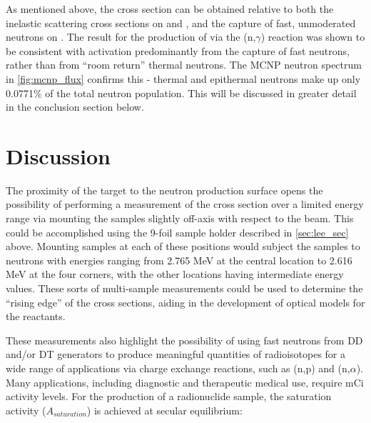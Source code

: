 As mentioned above, the cross section can be obtained relative to both the inelastic scattering cross sections on  and , and the capture of fast, unmoderated neutrons on .
The result for the production of  via the (n,$\gamma$) reaction was shown to be consistent with activation predominantly from the capture of fast neutrons, rather than from \enquote{room return} thermal neutrons.
The MCNP neutron spectrum in   \autoref{fig:mcnp_flux} confirms this - thermal and epithermal neutrons make up only 0.0771\% of the total neutron population.
 This will be discussed in greater detail in the conclusion section below.




 




          
\section{Discussion}




The proximity of the target to the neutron production surface opens the possibility of performing a measurement of the cross section over a limited energy range via mounting the samples slightly off-axis with respect to the beam.
 This could be accomplished using the 9-foil sample holder described in \autoref{sec:lee_sec} above.
 Mounting samples at each of these positions would subject the samples to neutrons with energies ranging from 2.765 MeV at the central location to 2.616 MeV at the four corners, with the other locations having intermediate energy values.
 These sorts of multi-sample measurements could be used to determine the \enquote{rising edge} of the cross sections, aiding in the development of optical models for the reactants.



These measurements also highlight the possibility of using fast neutrons from DD and/or DT generators to produce meaningful quantities of radioisotopes for a wide range of applications via charge exchange reactions, such as (n,p) and (n,$\alpha$).
 Many applications, including diagnostic and therapeutic medical use, require mCi activity levels.
 For the production of a radionuclide sample, the saturation activity ($A_{saturation}$) is achieved at secular equilibrium:

